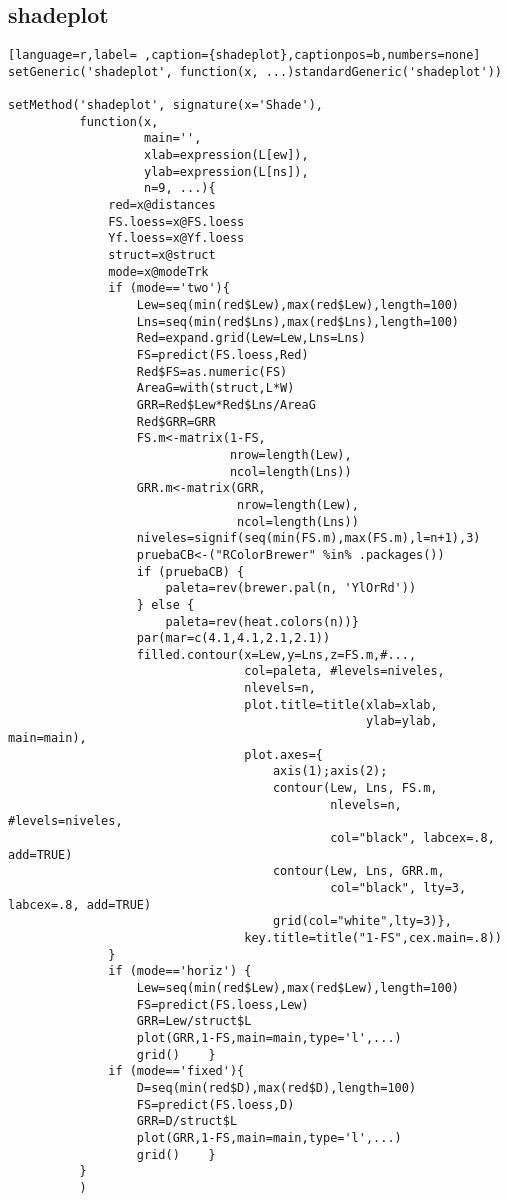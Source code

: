 \subsection{shadeplot}
\label{sec:org60b290d}
\label{subsec:shadeplot}
\begin{lstlisting}[language=r,label= ,caption={shadeplot},captionpos=b,numbers=none]
setGeneric('shadeplot', function(x, ...)standardGeneric('shadeplot'))

setMethod('shadeplot', signature(x='Shade'),
          function(x,
                   main='',
                   xlab=expression(L[ew]),
                   ylab=expression(L[ns]),
                   n=9, ...){
              red=x@distances
              FS.loess=x@FS.loess
              Yf.loess=x@Yf.loess
              struct=x@struct
              mode=x@modeTrk
              if (mode=='two'){
                  Lew=seq(min(red$Lew),max(red$Lew),length=100)
                  Lns=seq(min(red$Lns),max(red$Lns),length=100)
                  Red=expand.grid(Lew=Lew,Lns=Lns)
                  FS=predict(FS.loess,Red)
                  Red$FS=as.numeric(FS)
                  AreaG=with(struct,L*W)
                  GRR=Red$Lew*Red$Lns/AreaG
                  Red$GRR=GRR
                  FS.m<-matrix(1-FS,
                               nrow=length(Lew),
                               ncol=length(Lns))
                  GRR.m<-matrix(GRR,
                                nrow=length(Lew),
                                ncol=length(Lns))
                  niveles=signif(seq(min(FS.m),max(FS.m),l=n+1),3)
                  pruebaCB<-("RColorBrewer" %in% .packages())
                  if (pruebaCB) {
                      paleta=rev(brewer.pal(n, 'YlOrRd'))
                  } else {
                      paleta=rev(heat.colors(n))}
                  par(mar=c(4.1,4.1,2.1,2.1)) 
                  filled.contour(x=Lew,y=Lns,z=FS.m,#...,
                                 col=paleta, #levels=niveles,
                                 nlevels=n,
                                 plot.title=title(xlab=xlab,
                                                  ylab=ylab, main=main),
                                 plot.axes={
                                     axis(1);axis(2);
                                     contour(Lew, Lns, FS.m,
                                             nlevels=n, #levels=niveles,
                                             col="black", labcex=.8,  add=TRUE)
                                     contour(Lew, Lns, GRR.m,
                                             col="black", lty=3, labcex=.8, add=TRUE)
                                     grid(col="white",lty=3)},
                                 key.title=title("1-FS",cex.main=.8))
              }
              if (mode=='horiz') {
                  Lew=seq(min(red$Lew),max(red$Lew),length=100)
                  FS=predict(FS.loess,Lew)
                  GRR=Lew/struct$L
                  plot(GRR,1-FS,main=main,type='l',...)
                  grid()    }
              if (mode=='fixed'){
                  D=seq(min(red$D),max(red$D),length=100)
                  FS=predict(FS.loess,D)
                  GRR=D/struct$L
                  plot(GRR,1-FS,main=main,type='l',...)
                  grid()    }
          }
          )
\end{lstlisting}

